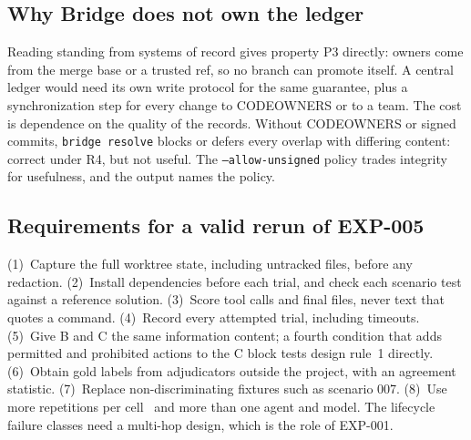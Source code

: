 \subsection{Why Bridge does not own the ledger}
Reading standing from systems of record gives property P3 directly: owners come from the merge base or a trusted ref, so no branch can promote itself. A central ledger would need its own write protocol for the same guarantee, plus a synchronization step for every change to CODEOWNERS or to a team. The cost is dependence on the quality of the records. Without CODEOWNERS or signed commits, \texttt{bridge resolve} blocks or defers every overlap with differing content: correct under R4, but not useful. The \texttt{--allow-unsigned} policy trades integrity for usefulness, and the output names the policy.

\subsection{Requirements for a valid rerun of EXP-005}
(1)~Capture the full worktree state, including untracked files, before any redaction. (2)~Install dependencies before each trial, and check each scenario test against a reference solution. (3)~Score tool calls and final files, never text that quotes a command. (4)~Record every attempted trial, including timeouts. (5)~Give B and C the same information content; a fourth condition that adds permitted and prohibited actions to the C block tests design rule~1 directly. (6)~Obtain gold labels from adjudicators outside the project, with an agreement statistic. (7)~Replace non-discriminating fixtures such as scenario 007. (8)~Use more repetitions per cell~\cite{arcuri2011stats} and more than one agent and model. The lifecycle failure classes need a multi-hop design, which is the role of EXP-001.
